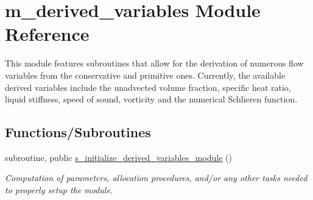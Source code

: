 \hypertarget{namespacem__derived__variables}{}\section{m\+\_\+derived\+\_\+variables Module Reference}
\label{namespacem__derived__variables}


This module features subroutines that allow for the derivation of numerous flow variables from the conservative and primitive ones. Currently, the available derived variables include the unadvected volume fraction, specific heat ratio, liquid stiffness, speed of sound, vorticity and the numerical Schlieren function.  


\subsection*{Functions/\+Subroutines}
\begin{DoxyCompactItemize}
\item 
subroutine, public \hyperlink{namespacem__derived__variables_a15a6d70e2bd1c9b7001c753ca1f2ee27}{s\+\_\+initialize\+\_\+derived\+\_\+variables\+\_\+module} ()
\begin{DoxyCompactList}\small\item\em Computation of parameters, allocation procedures, and/or any other tasks needed to properly setup the module. \end{DoxyCompactList}\end{DoxyCompactItemize}
